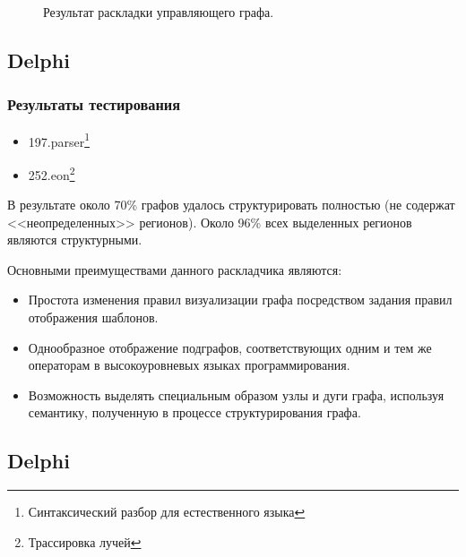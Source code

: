 \documentclass{beamer}
\begin{document}
\begin{frame}
\begin{figure}[htbp]
\begin{minipage}[b]{0.49\linewidth}
	\end{minipage}
	\tiny{
	\caption{Результат раскладки управляющего графа.}
	}
	\label{fig:image1}
\end{figure}
\end{frame}


\subsection{Delphi}
\begin{frame}
\frametitle{Результаты тестирования}
\footnotesize{
\begin{itemize}
	\item 197.parser\footnote{Синтаксический разбор для естественного языка}
	\item 252.eon\footnote{Трассировка лучей}
\end{itemize}

В результате около 70\% графов удалось структурировать полностью (не содержат <<неопределенных>> регионов). Около 96\% всех выделенных регионов являются структурными.

Основными преимуществами данного раскладчика являются:
\begin{itemize}
	\item Простота изменения правил визуализации графа посредством задания правил отображения шаблонов.
	\item Однообразное отображение подграфов, соответствующих одним и тем же операторам в высокоуровневых языках программирования.
	\item Возможность выделять специальным образом узлы и дуги графа, используя семантику, полученную в процессе структурирования графа.
\end{itemize}
}
\end{frame}


\subsection{Delphi}
\maketitle
\end{document}
